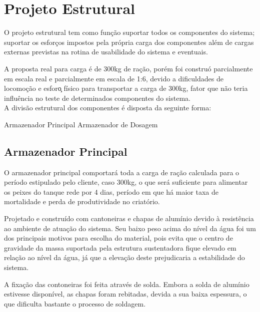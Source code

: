\section{Projeto Estrutural}
O projeto estrutural tem como fun\c{c}\~{a}o suportar todos os componentes do sistema; suportar os esfor\c{c}os impostos pela pr\'{o}pria carga dos componentes al\'{e}m de cargas externas previstas na rotina de usabilidade do sistema e eventuais.

A proposta real para carga \'{e} de 300kg de ra\c{c}\~{a}o, por\'{e}m foi constru\'{o} parcialmente em escala real e parcialmente em escala de 1:6, devido a dificuldades de locomo\c{c}\~{a}o e esfor\c{o} f\'{i}sico para transportar a carga de 300kg, fator que n\~{a}o teria influ\^{e}ncia no teste de determinados componentes do sistema. \\

A divis\~{a}o estrutural dos componentes \'{e} disposta da seguinte forma:

  \subitem Armazenador Principal
  \subitem Armazenador de Dosagem


\subsection{Armazenador Principal}
O armazenador principal comportar\'{a} toda a carga de ra\c{c}\~{a}o calculada para o per\'{i}odo estipulado pelo cliente, caso 300kg, o que ser\'{a} suficiente para alimentar os peixes do tanque rede por 4 dias, per\'{i}odo em que h\'{a} maior taxa de mortalidade e perda de produtividade no criat\'{o}rio.

Projetado e constru\'{i}do com cantoneiras e chapas de alum\'{i}nio devido \`{a} resist\^{e}ncia ao ambiente de atua\c{c}\~{a}o do sistema. Seu baixo peso acima do n\'{i}vel da \'{a}gua foi um dos principais motivos para escolha do material, pois evita que o centro de gravidade da massa suportada pela estrutura sustentadora fique elevado em rela\c{c}\~{a}o ao n\'{i}vel da \'{a}gua, j\'{a} que a eleva\c{c}\~{a}o deste prejudicaria a estabilidade do sistema.

A fixa\c{c}\~{a}o das contoneiras foi feita atrav\'{e}s de solda. Embora a solda de alum\'{i}nio estivesse dispon\'{i}vel, as chapas foram rebitadas, devida a sua baixa espessura, o que dificulta bastante o processo de soldagem.

